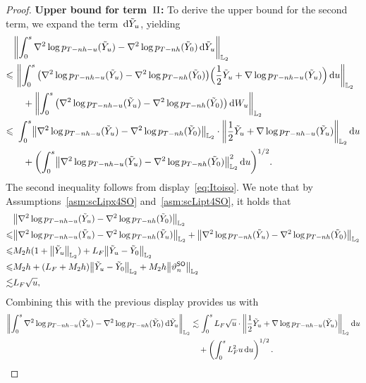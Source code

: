 \begin{proof}
\noindent \textbf{Upper bound for term~$\rm II$:}
To derive the upper bound for the second term, we expand the term ${\,\rm d} \tilde{Y}_u$, yielding
\begin{align*}
    &\left\lVert\int_0^s\nabla^2\log p_{T-nh-u}(\tilde{Y}_u)-\nabla^2\log p_{T-nh}(\tilde{Y}_0)\rmd\tilde{Y}_u\right\rVert_{\Ltwo}\\
    \leqslant&\,\,\left\lVert\int_0^s\big(\nabla^2\log p_{T-nh-u}(\tilde{Y}_u)-\nabla^2\log p_{T-nh}(\tilde{Y}_0)\big)\Big(\dfrac{1}{2}\tilde{Y}_u+\nabla\log p_{T-nh-u}(\tilde{Y}_u)\Big)\rmd u\right\rVert_{\Ltwo}\\
    &\quad +\left\lVert\int_0^s\big(\nabla^2\log p_{T-nh-u}(\tilde{Y}_u)-\nabla^2\log p_{T-nh}(\tilde{Y}_0)\big)\rmd W_u\right\rVert_{\Ltwo}\\
    \leqslant&\,\,\int_0^s\left\lVert\nabla^2\log p_{T-nh-u}(\tilde{Y}_u)-\nabla^2\log p_{T-nh}(\tilde{Y}_0)\right\lVert_{\Ltwo}\cdot\left\lVert\dfrac{1}{2}\tilde{Y}_u+\nabla\log p_{T-nh-u}(\tilde{Y}_u)\right\rVert_{\Ltwo}\rmd u\\
    &\quad +\left(\int_0^s\l|\nabla^2\log p_{T-nh-u}(\tilde{Y}_u)-\nabla^2\log p_{T-nh}(\tilde{Y}_0)\r|_{\Ltwo}^2\rmd u\right)^{1/2}.
\end{align*}
The second inequality follows from display~\eqref{eq:Itoiso}.
We note that by Assumptions~\ref{asm:scLipx4SO} and~\ref{asm:scLipt4SO}, it holds that
\begin{align*}
    &\l|\nabla^2\log p_{T-nh-u}(\tilde{Y}_u)-\nabla^2\log p_{T-nh}(\tilde{Y}_0)\r|_{\Ltwo}\\
    \leqslant& \l|\nabla^2\log p_{T-nh-u}(\tilde{Y}_u)-\nabla^2\log p_{T-nh}(\tilde{Y}_u)\r|_{\Ltwo}+\l|\nabla^2\log p_{T-nh}(\tilde{Y}_u)-\nabla^2\log p_{T-nh}(\tilde{Y}_0)\r|_{\Ltwo}\\
    \leqslant& M_2h(1+\l|\tilde{Y}_u\r|_{\Ltwo})+L_F\l|\tilde{Y}_u-\tilde{Y}_0\r|_{\Ltwo}\\
    \leqslant& M_2h+(L_F+M_2h)\l|\tilde{Y}_u-\tilde{Y}_0\r|_{\Ltwo}+M_2h\l|\vartheta_n^{\sf SO}\r|_{\Ltwo}\\
    \lesssim& L_F\sqrt{u},
\end{align*}
Combining this with the previous display provides us with
\begin{align*}
\l|\int_0^s\nabla^2\log p_{T-nh-u}(\tilde{Y}_u)-\nabla^2\log p_{T-nh}(\tilde{Y}_0)\rmd \tilde Y_u\r|_{\Ltwo}
&\lesssim \int_0^sL_F\sqrt{u}\cdot\left\lVert\dfrac{1}{2}\tilde{Y}_u+\nabla\log p_{T-nh-u}(\tilde{Y}_u)\right\rVert_{\Ltwo}\rmd u\\
&\quad +\left(\int_0^sL_F^2u\rmd u\right)^{1/2}\,.

\end{align*}
\end{proof}
